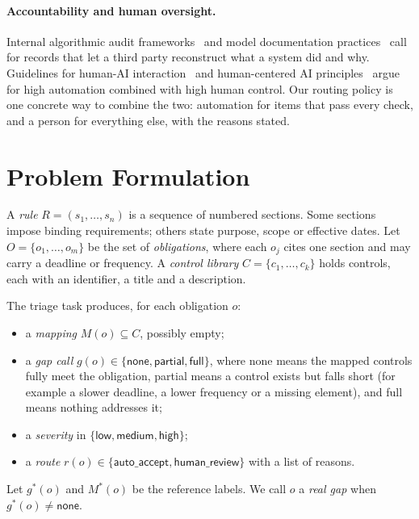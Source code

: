 \documentclass[sigconf,review,anonymous]{acmart}
\newcommand{\gapnone}{\textsf{none}}
\newcommand{\gappartial}{\textsf{partial}}
\newcommand{\gapfull}{\textsf{full}}
\begin{document}
\paragraph{Accountability and human oversight.}
Internal algorithmic audit frameworks~\cite{raji2020audit} and model
documentation practices~\cite{mitchell2019modelcards} call for records that
let a third party reconstruct what a system did and why. Guidelines for
human-AI interaction~\cite{amershi2019guidelines} and human-centered AI
principles~\cite{shneiderman2020hcai} argue for high automation combined with
high human control. Our routing policy is one concrete way to combine the
two: automation for items that pass every check, and a person for everything
else, with the reasons stated.

\section{Problem Formulation}
\label{sec:problem}

A \emph{rule} $R = (s_1, \ldots, s_n)$ is a sequence of numbered sections.
Some sections impose binding requirements; others state purpose, scope or
effective dates. Let $O = \{o_1, \ldots, o_m\}$ be the set of
\emph{obligations}, where each $o_j$ cites one section and may carry a
deadline or frequency. A \emph{control library} $C = \{c_1, \ldots, c_k\}$
holds controls, each with an identifier, a title and a description.

The triage task produces, for each obligation $o$:
\begin{itemize}
  \item a \emph{mapping} $M(o) \subseteq C$, possibly empty;
  \item a \emph{gap call} $g(o) \in \{\gapnone, \gappartial, \gapfull\}$,
  where \gapnone{} means the mapped controls fully meet the obligation,
  \gappartial{} means a control exists but falls short (for example a slower
  deadline, a lower frequency or a missing element), and \gapfull{} means
  nothing addresses it;
  \item a \emph{severity} in $\{\textsf{low}, \textsf{medium}, \textsf{high}\}$;
  \item a \emph{route} $r(o) \in \{\textsf{auto\_accept}, \textsf{human\_review}\}$
  with a list of reasons.
\end{itemize}

Let $g^*(o)$ and $M^*(o)$ be the reference labels. We call $o$ a \emph{real
gap} when $g^*(o) \neq \gapnone$.
\end{document}
